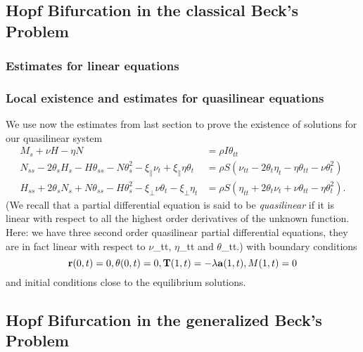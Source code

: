 
\subsection{Hopf Bifurcation in the classical Beck's Problem}
\subsubsection{Estimates for linear equations}
\subsubsection{Local existence and estimates for quasilinear equations}
We use now the estimates from last section to prove the existence of solutions for our quasilinear system
\[
\begin{align}
M_s + \nu H -\eta N 
&= \rho I \theta_{tt}\\
N_{ss} - 2\theta_sH_s - H\theta_{ss}- N\theta_s^2 
- \xi_{\parallel}\nu_t + \xi_{\parallel}\eta\theta_t
&= \rho S (\nu_{tt} - 2 \theta_t\eta_t - \eta\theta_{tt} - \nu\theta_t^2)\\
H_{ss} + 2\theta_sN_s + N\theta_{ss} - H\theta_s^2 
- \xi_{\perp}\nu\theta_t - \xi_{\perp}\eta_t
&= \rho S (\eta_{tt} + 2\theta_t\nu_t + \nu\theta_{tt} - \eta\theta_t^2).
\end{align}
\]
(We recall that a partial differential equation is said to be \emph{quasilinear} if it is linear with respect to all the highest order derivatives of the unknown function. Here: we have three second order quasilinear partial differential equations, they are in fact linear with respect to $\nu$_{tt}, $\eta$_{tt} and  $\theta$_{tt}.)
with boundary conditions
\[
\mathbf{r}(0,t)= 0,\\
\theta(0,t) = 0,\\
\mathbf{T}(1,t) = -\lambda \mathbf{a}(1,t),\\
M(1,t) = 0\\
\]
and initial conditions close to the equilibrium solutions.

\subsection{Hopf Bifurcation in the generalized Beck's Problem}
